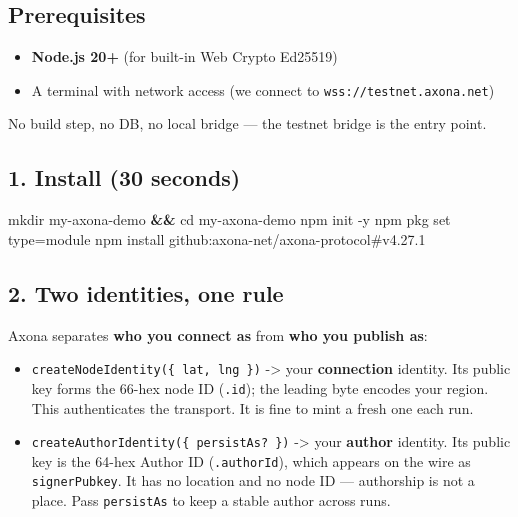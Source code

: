 \documentclass[
  nobib]{tufte-handout}
\newenvironment{Shaded}{}{}
\newcommand{\AttributeTok}[1]{\textcolor[rgb]{0.49,0.56,0.16}{#1}}
\newcommand{\BuiltInTok}[1]{\textcolor[rgb]{0.00,0.50,0.00}{#1}}
\newcommand{\ExtensionTok}[1]{#1}
\newcommand{\FunctionTok}[1]{\textcolor[rgb]{0.02,0.16,0.49}{#1}}
\newcommand{\KeywordTok}[1]{\textcolor[rgb]{0.00,0.44,0.13}{\textbf{#1}}}
\newcommand{\NormalTok}[1]{#1}
\providecommand{\tightlist}{%
  \setlength{\itemsep}{0pt}\setlength{\parskip}{0pt}}
\begin{document}
\subsection{Prerequisites}\label{prerequisites}

\begin{itemize}
\tightlist
\item
  \textbf{Node.js 20+} (for built-in Web Crypto Ed25519)
\item
  A terminal with network access (we connect to
  \texttt{wss://testnet.axona.net})
\end{itemize}

No build step, no DB, no local bridge --- the testnet bridge is the
entry point.

\subsection{1. Install (30 seconds)}\label{install-30-seconds}

\begin{Shaded}
\begin{Highlighting}[]
\FunctionTok{mkdir}\NormalTok{ my{-}axona{-}demo }\KeywordTok{\&\&} \BuiltInTok{cd}\NormalTok{ my{-}axona{-}demo}
\ExtensionTok{npm}\NormalTok{ init }\AttributeTok{{-}y}
\ExtensionTok{npm}\NormalTok{ pkg set type=module}
\ExtensionTok{npm}\NormalTok{ install github:axona{-}net/axona{-}protocol\#v4.27.1}
\end{Highlighting}
\end{Shaded}

\subsection{2. Two identities, one rule}\label{two-identities-one-rule}

Axona separates \textbf{who you connect as} from \textbf{who you publish
as}:

\begin{itemize}
\tightlist
\item
  \texttt{createNodeIdentity(\{\ lat,\ lng\ \})} -\textgreater{} your
  \textbf{connection} identity. Its public key forms the 66-hex node ID
  (\texttt{.id}); the leading byte encodes your region. This
  authenticates the transport. It is fine to mint a fresh one each run.
\item
  \texttt{createAuthorIdentity(\{\ persistAs?\ \})} -\textgreater{} your
  \textbf{author} identity. Its public key is the 64-hex Author ID
  (\texttt{.authorId}), which appears on the wire as
  \texttt{signerPubkey}. It has no location and no node ID ---
  authorship is not a place. Pass \texttt{persistAs} to keep a stable
  author across runs.
\end{itemize}
\end{document}
